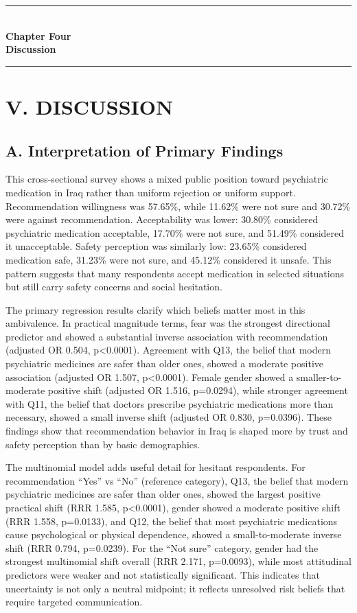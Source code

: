 \documentclass[12pt,a4paper]{article}
\begin{document}
\newpage
\newpage
\thispagestyle{plain}
\begin{center}\vspace*{0.30\textheight}
{\Large\bfseries\rule{4cm}{0.4pt}}\\[10pt]
{\Huge\bfseries Chapter Four}\\[8pt]
{\Large\bfseries Discussion}\\[10pt]
{\Large\bfseries\rule{4cm}{0.4pt}}
\end{center}
\newpage
\section*{V. DISCUSSION}
\subsection*{A. Interpretation of Primary Findings}
This cross-sectional survey shows a mixed public position toward psychiatric medication in Iraq rather than uniform rejection or uniform support. Recommendation willingness was 57.65\%, while 11.62\% were not sure and 30.72\% were against recommendation. Acceptability was lower: 30.80\% considered psychiatric medication acceptable, 17.70\% were not sure, and 51.49\% considered it unacceptable. Safety perception was similarly low: 23.65\% considered medication safe, 31.23\% were not sure, and 45.12\% considered it unsafe. This pattern suggests that many respondents accept medication in selected situations but still carry safety concerns and social hesitation.

The primary regression results clarify which beliefs matter most in this ambivalence. In practical magnitude terms, fear was the strongest directional predictor and showed a substantial inverse association with recommendation (adjusted OR 0.504, p<0.0001). Agreement with Q13, the belief that modern psychiatric medicines are safer than older ones, showed a moderate positive association (adjusted OR 1.507, p<0.0001). Female gender showed a smaller-to-moderate positive shift (adjusted OR 1.516, p=0.0294), while stronger agreement with Q11, the belief that doctors prescribe psychiatric medications more than necessary, showed a small inverse shift (adjusted OR 0.830, p=0.0396). These findings show that recommendation behavior in Iraq is shaped more by trust and safety perception than by basic demographics.

The multinomial model adds useful detail for hesitant respondents. For recommendation “Yes” vs “No” (reference category), Q13, the belief that modern psychiatric medicines are safer than older ones, showed the largest positive practical shift (RRR 1.585, p<0.0001), gender showed a moderate positive shift (RRR 1.558, p=0.0133), and Q12, the belief that most psychiatric medications cause psychological or physical dependence, showed a small-to-moderate inverse shift (RRR 0.794, p=0.0239). For the “Not sure” category, gender had the strongest multinomial shift overall (RRR 2.171, p=0.0093), while most attitudinal predictors were weaker and not statistically significant. This indicates that uncertainty is not only a neutral midpoint; it reflects unresolved risk beliefs that require targeted communication.
\end{document}
